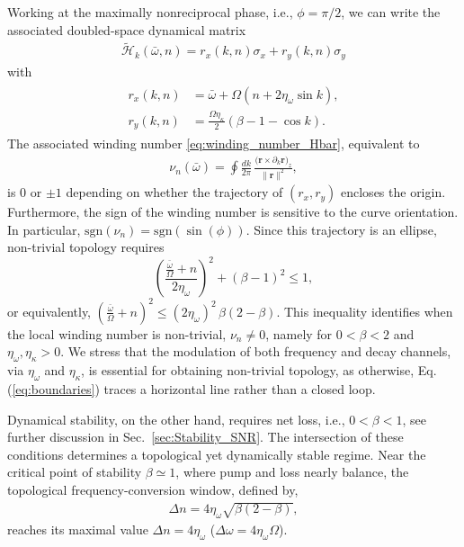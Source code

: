 \documentclass[a4paper,twocolumn,floatfix,10pt,superscriptaddress]%
{quantumarticle}
\newcommand{\mcl}[1]{\mathcal{#1}}
\newcommand{\bsb}[1]{\boldsymbol{#1}}
\newcommand{\bomega}{{\bar{\omega}}}
\newcommand{\mcH}{{\mcl{H}}}
\begin{document}
Working at the maximally nonreciprocal phase, i.e., $\phi=\pi/2$, we can write the associated doubled-space dynamical matrix 
\begin{align}
\tilde{\mcH}_k(\bomega,n)=r_x(k,n)\sigma_x+r_y(k,n)\sigma_y \label{eq:H_k_omegabar_n}
\end{align}
with
\begin{align}\begin{aligned}
r_x(k,n)&=\bar{\omega} +\Omega\left(n+2\eta_\omega \sin k\right), \\
r_y(k,n)&=\tfrac{\Omega\eta_\kappa}{2}(\beta-1-\cos k).
\end{aligned}
\label{eq:rxry}
\end{align}
The associated winding number \eqref{eq:winding_number_Hbar}, equivalent to 
\begin{align}
    \nu_n(\bomega)=\oint \frac{dk}{2\pi}\,\frac{\big(\bsb{r}\times \partial_k \bsb{r}\big)_z}{\|\bsb{r}\|^2},
\end{align}
is $0$ or $\pm 1$ depending on whether the trajectory of $(r_x,r_y)$ encloses the origin. Furthermore, the sign of the winding number is sensitive to the curve orientation. In particular, $\mathrm{sgn}(\nu_n)=\mathrm{sgn}(\sin(\phi))$. Since this trajectory is an ellipse, non-trivial topology requires
\begin{equation}
\left(\frac{\frac{\bomega}{\Omega}+n}{2\eta_\omega}\right)^2
+\left(\beta-1\right)^2\le1,
\label{eq:boundaries}
\end{equation}
or equivalently, $\left( \frac{\bar{\omega}}{\Omega} + n \right)^2 \le (2\eta_\omega)^2\,\beta(2-\beta).$
This inequality identifies when the local winding number is non-trivial, $\nu_n \neq 0$, namely for $0 < \beta < 2$ and $\eta_\omega,\eta_\kappa > 0$. We stress that the modulation of both frequency and decay channels, via $\eta_\omega$  and $\eta_\kappa$, is essential for obtaining non-trivial topology, as otherwise, Eq. (\ref{eq:boundaries}) traces a horizontal line rather than a closed loop.

Dynamical stability, on the other hand, requires net loss, i.e., $0 < \beta < 1$, see further discussion in Sec.~\ref{sec:Stability_SNR}. The intersection of these conditions determines a topological yet dynamically stable regime. Near the critical point of stability $\beta \simeq 1$, where pump and loss nearly balance, the topological frequency-conversion window, defined by,
\begin{eqnarray}
    \Delta n = 4\eta_\omega \sqrt{\beta(2-\beta)},
\end{eqnarray}
reaches its maximal value $\Delta n = 4\eta_\omega$ ($\Delta\omega = 4\eta_\omega \Omega$).
\end{document}
